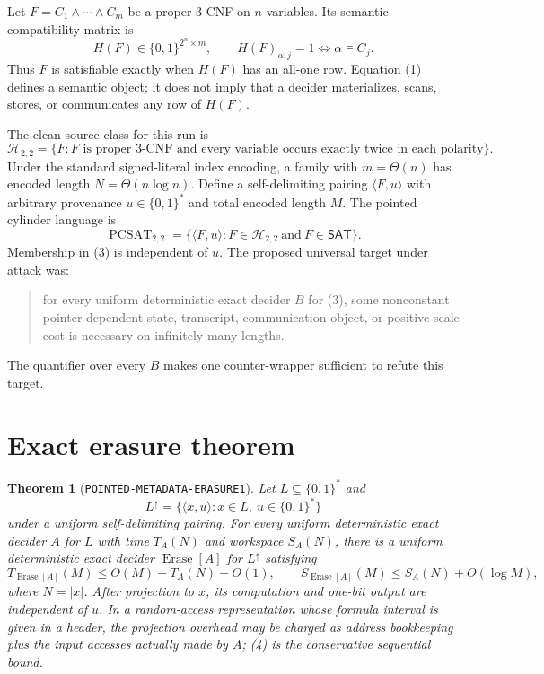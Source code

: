 \documentclass[11pt]{article}
\newtheorem{theorem}{Theorem}
\newcommand{\SAT}{\mathsf{SAT}}
\newcommand{\Htwo}{\mathcal H_{2,2}}
\begin{document}
Let $F=C_1\wedge\cdots\wedge C_m$ be a proper 3-CNF on $n$ variables.  Its semantic compatibility matrix is
\[
 H(F)\in\{0,1\}^{2^n\times m},\qquad
 H(F)_{\alpha,j}=1\Longleftrightarrow \alpha\models C_j.
 \tag{1}
\]
Thus $F$ is satisfiable exactly when $H(F)$ has an all-one row.  Equation (1) defines a semantic object; it does not imply that a decider materializes, scans, stores, or communicates any row of $H(F)$.

The clean source class for this run is
\[
 \Htwo=\{F:\text{$F$ is proper 3-CNF and every variable occurs exactly twice in each polarity}\}.
 \tag{2}
\]
Under the standard signed-literal index encoding, a family with $m=\Theta(n)$ has encoded length $N=\Theta(n\log n)$.  Define a self-delimiting pairing $\langle F,u\rangle$ with arbitrary provenance $u\in\{0,1\}^*$ and total encoded length $M$.  The pointed cylinder language is
\[
 \operatorname{PCSAT}_{2,2}
 =\{\langle F,u\rangle:F\in\Htwo\ \text{and}\ F\in\SAT\}.
 \tag{3}
\]
Membership in (3) is independent of $u$.  The proposed universal target under attack was:
\begin{quote}
for every uniform deterministic exact decider $B$ for (3), some nonconstant pointer-dependent state, transcript, communication object, or positive-scale cost is necessary on infinitely many lengths.
\end{quote}
The quantifier over every $B$ makes one counter-wrapper sufficient to refute this target.

\section{Exact erasure theorem}

\begin{theorem}[\texttt{POINTED-METADATA-ERASURE1}]
Let $L\subseteq\{0,1\}^*$ and
\[
 L^{\uparrow}=\{\langle x,u\rangle:x\in L,\ u\in\{0,1\}^*\}
\]
under a uniform self-delimiting pairing.  For every uniform deterministic exact decider $A$ for $L$ with time $T_A(N)$ and workspace $S_A(N)$, there is a uniform deterministic exact decider $\operatorname{Erase}[A]$ for $L^{\uparrow}$ satisfying
\[
 T_{\operatorname{Erase}[A]}(M)
 \le O(M)+T_A(N)+O(1),\qquad
 S_{\operatorname{Erase}[A]}(M)
 \le S_A(N)+O(\log M),
 \tag{4}
\]
where $N=|x|$.  After projection to $x$, its computation and one-bit output are independent of $u$.  In a random-access representation whose formula interval is given in a header, the projection overhead may be charged as address bookkeeping plus the input accesses actually made by $A$; (4) is the conservative sequential bound.
\end{theorem}
\end{document}
